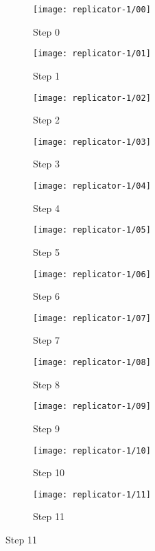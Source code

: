 \begin{figure}[!ht]
    \centering
    \begin{subfigure}{0.32\textwidth}
        \centering
        \texttt{[image: replicator-1/00]}
        \caption{Step 0}
    \end{subfigure}
    \begin{subfigure}{0.32\textwidth}
        \centering
        \texttt{[image: replicator-1/01]}
        \caption{Step 1}
    \end{subfigure}
    \begin{subfigure}{0.32\textwidth}
        \centering
        \texttt{[image: replicator-1/02]}
        \caption{Step 2}
    \end{subfigure}
    \par\bigskip
    \begin{subfigure}{0.32\textwidth}
        \centering
        \texttt{[image: replicator-1/03]}
        \caption{Step 3}
    \end{subfigure}
    \begin{subfigure}{0.32\textwidth}
        \centering
        \texttt{[image: replicator-1/04]}
        \caption{Step 4}
    \end{subfigure}
    \begin{subfigure}{0.32\textwidth}
        \centering
        \texttt{[image: replicator-1/05]}
        \caption{Step 5}
    \end{subfigure}
    \par\bigskip
    \begin{subfigure}{0.32\textwidth}
        \centering
        \texttt{[image: replicator-1/06]}
        \caption{Step 6}
    \end{subfigure}
    \begin{subfigure}{0.32\textwidth}
        \centering
        \texttt{[image: replicator-1/07]}
        \caption{Step 7}
    \end{subfigure}
    \begin{subfigure}{0.32\textwidth}
        \centering
        \texttt{[image: replicator-1/08]}
        \caption{Step 8}
    \end{subfigure}
    \par\bigskip
    \begin{subfigure}{0.32\textwidth}
        \centering
        \texttt{[image: replicator-1/09]}
        \caption{Step 9}
    \end{subfigure}
    \begin{subfigure}{0.32\textwidth}
        \centering
        \texttt{[image: replicator-1/10]}
        \caption{Step 10}
    \end{subfigure}
    \begin{subfigure}{0.32\textwidth}
        \centering
        \texttt{[image: replicator-1/11]}
        \caption{Step 11}
    \end{subfigure}
\end{figure}

